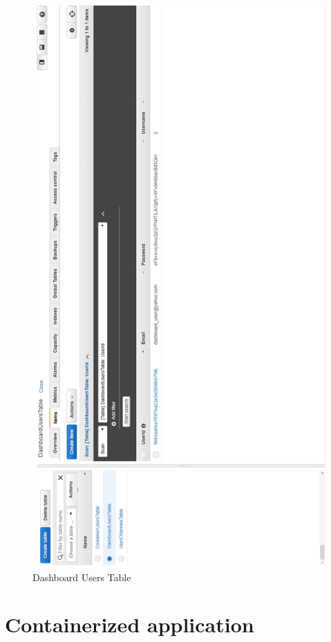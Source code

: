 \begin{figure}[p]
	\centering
	\noindent
	\includegraphics[width=0.5\paperwidth]{./images/aws_resources/DynamoDB.PNG}
	\caption{Dashboard Users Table}
	\label{fig:dynamodb}
\end{figure}

\section{Containerized application}
\label{chap:04:04}

